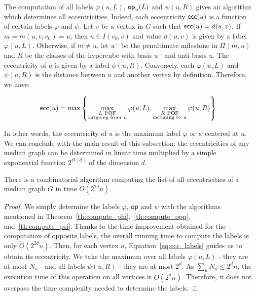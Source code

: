 \documentclass[a4paper,UKenglish,numberwithinsect,cleveref, autoref]{lipics-v2021}
\newcommand{\set}[1]{\left\{ #1 \right\}}
\newcommand{\ecc}{\mbox{\textsf{ecc}}}
\newcommand{\opp}{\mbox{\textsf{op}}}
\begin{document}
 The computation of all labels $\varphi(u,L)$, $\opp_u(L)$ and $\psi(u,R)$ gives an algorithm which determines all eccentricities. Indeed, each eccentricity $\ecc(u)$ is a function of certain labels $\varphi$ and $\psi$. Let $v$ be a vertex in $G$ such that $\ecc(u) = d(u,v)$. If $m = m(u,v,v_0) = u$, then $u \in I(v_0,v)$ and value $d(u,v)$ is given by a label $\varphi(u,L)$. Otherwise, if $m \neq u$, let $u^-$ be the penultimate milestone in $\Pi(m,u)$ and $R$ be the classes of the hypercube with basis $u^-$ and anti-basis $u$. The eccentricity of $u$ is given by a label $\psi(u,R)$. Conversely, each $\varphi(u,L)$ and $\psi(u,R)$ is the distance between $u$ and another vertex by definition. Therefore, we have:

\begin{equation}
\ecc(u) = \mbox{max}\set{\max\limits_{\substack{L ~\mbox{\scriptsize{POF}} \\ \mbox{\scriptsize{outgoing from}}~ u}} \varphi(u,L), \max\limits_{\substack{R ~\mbox{\scriptsize{POF}} \\ \mbox{\scriptsize{incoming to}}~ u}} \psi(u,R)}
\label{eq:ecc_labels}
\end{equation}

In other words, the eccentricity of $u$ is the maximum label $\varphi$ or $\psi$ centered at $u$. We can conclude with the main result of this subsection: the eccentricities of any median graph can be determined in linear time multiplied by a simple exponential function $2^{O(d)}$ of the dimension $d$.

\begin{theorem}
There is a combinatorial algorithm computing the list of all eccentricities of a median graph $G$ in time $\tilde{O}(2^{2d}n)$.
\label{th:simple_ecc}
\end{theorem}
\begin{proof}
We simply determine the labels $\varphi$, $\opp$ and $\psi$ with the algorithms mentioned in Theorem~\ref{th:compute_phi},~\ref{th:compute_opp}, and~\ref{th:compute_psi}. Thanks to the time improvement obtained for the computation of opposite labels, the overall running time to compute the labels is only $\tilde{O}(2^{2d}n)$. Then, for each vertex $u$, Equation~\eqref{eq:ecc_labels} guides us to obtain its eccentricity. We take the maximum over all labels $\varphi(u,L)$ - they are at most $N_u$ - and all labels $\psi(u,R)$ - they are at most $2^d$. As $\sum_u N_u \le 2^dn$, the execution time of this operation on all vertices is $\tilde{O}(2^dn)$. Therefore, it does not overpass the time complexity needed to determine the labels.
\end{proof}
\end{document}
